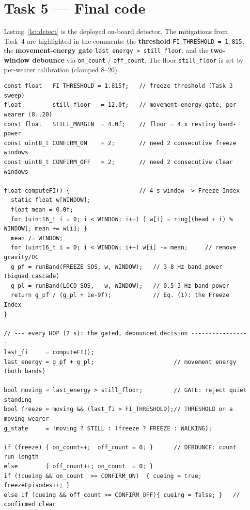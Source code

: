 \documentclass[11pt,a4paper]{article}
\begin{document}
\section{Task 5 --- Final code}
\label{sec:task5}

Listing~\ref{lst:detect} is the deployed on-board detector. The mitigations from
Task~4 are highlighted in the comments: the \textbf{threshold} \texttt{FI\_THRESHOLD
= 1.815}, the \textbf{movement-energy gate} \texttt{last\_energy > still\_floor}, and
the \textbf{two-window debounce} via \texttt{on\_count} / \texttt{off\_count}. The
floor \texttt{still\_floor} is set by per-wearer calibration (clamped \numrange{8}{20}).

\begin{lstlisting}[style=cpp,label={lst:detect},emph={FI_THRESHOLD,still_floor,STILL_MARGIN,CONFIRM_ON,CONFIRM_OFF,on_count,off_count},emphstyle={\color{brick}\bfseries},caption={On-board freeze detector (Circuit Playground, cpx\_fog\_standalone.ino). The \textbf{threshold} and gate parameters fixed in Task~3 and the three Task~4 false-positive mitigations are \textcolor{brick}{\textbf{emphasised in red}} and flagged in the inline comments: the movement-energy \textbf{gate} (\texttt{still\_floor}), the \textbf{threshold} test (\texttt{FI\_THRESHOLD}), and the two-window \textbf{debounce} (\texttt{on\_count}/\texttt{off\_count}).}]
const float   FI_THRESHOLD = 1.815f;   // freeze threshold (Task 3 sweep)
float         still_floor   = 12.0f;   // movement-energy gate, per-wearer (8..20)
const float   STILL_MARGIN  = 4.0f;    // floor = 4 x resting band-power
const uint8_t CONFIRM_ON    = 2;       // need 2 consecutive freeze windows
const uint8_t CONFIRM_OFF   = 2;       // need 2 consecutive clear windows

float computeFI() {                    // 4 s window -> Freeze Index
  static float w[WINDOW];
  float mean = 0.0f;
  for (uint16_t i = 0; i < WINDOW; i++) { w[i] = ring[(head + i) % WINDOW]; mean += w[i]; }
  mean /= WINDOW;
  for (uint16_t i = 0; i < WINDOW; i++) w[i] -= mean;     // remove gravity/DC
  g_pf = runBand(FREEZE_SOS, w, WINDOW);   // 3-8 Hz band power  (biquad cascade)
  g_pl = runBand(LOCO_SOS,   w, WINDOW);   // 0.5-3 Hz band power
  return g_pf / (g_pl + 1e-9f);            // Eq. (1): the Freeze Index
}

// --- every HOP (2 s): the gated, debounced decision -----------------
last_fi     = computeFI();
last_energy = g_pf + g_pl;                       // movement energy (both bands)

bool moving = last_energy > still_floor;         // GATE: reject quiet standing
bool freeze = moving && (last_fi > FI_THRESHOLD);// THRESHOLD on a moving wearer
g_state     = !moving ? STILL : (freeze ? FREEZE : WALKING);

if (freeze) { on_count++;  off_count = 0; }      // DEBOUNCE: count run length
else        { off_count++; on_count  = 0; }
if (!cueing && on_count  >= CONFIRM_ON)  { cueing = true;  freezeEpisodes++; }
else if (cueing && off_count >= CONFIRM_OFF){ cueing = false; }   // confirmed clear
\end{lstlisting}
\end{document}
